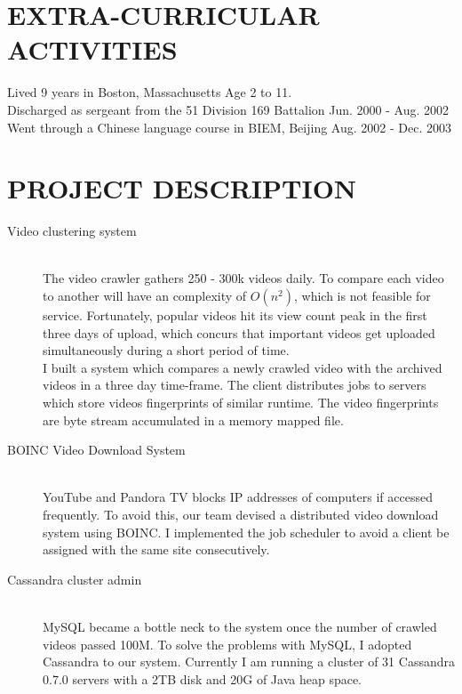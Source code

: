 \documentclass[line,margin]{res}
\begin{document}
\begin{resume}
\section{EXTRA-CURRICULAR \\ ACTIVITIES}
Lived 9 years in Boston, Massachusetts \hfill Age 2 to 11. \\
Discharged as sergeant from the 51 Division 169 Battalion \hfill Jun. 2000 - Aug. 2002 \\
Went through a Chinese language course in BIEM, Beijing \hfill Aug. 2002 - Dec. 2003 \\


\section{PROJECT DESCRIPTION} \begin{description}
                              \item[Video clustering system] \hfill \\
                              The video crawler gathers 250 - 300k videos daily. To compare each video to another will have an complexity of $O(n^2)$, which is not feasible for service. Fortunately, popular videos hit its view count peak in the first three days of upload, which concurs that important videos get uploaded simultaneously during a short period of time.\\
                 I built a system which compares a newly crawled video with the archived videos in a three day time-frame. The client distributes jobs to servers which store videos fingerprints of similar runtime. The video fingerprints are byte stream accumulated in a memory mapped file.
                              \item[BOINC Video Download System] \hfill \\
                YouTube and Pandora TV blocks IP addresses of computers if accessed frequently. To avoid this, our team devised a distributed video download system using BOINC. I implemented the job scheduler to avoid a client be assigned with the same site consecutively.
                              \item[Cassandra cluster admin] \hfill \\
                MySQL became a bottle neck to the system once the number of crawled videos passed 100M. To solve the problems with MySQL, I adopted Cassandra to our system. Currently I am running a cluster of 31 Cassandra 0.7.0 servers with a 2TB disk and 20G of Java heap space.

\end{description}
\end{resume}
\end{document}
